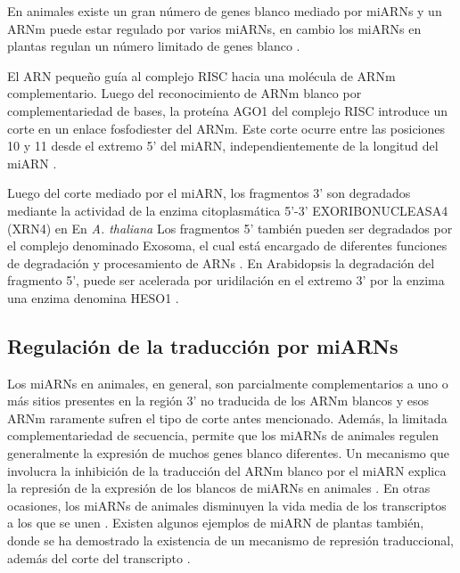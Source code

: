 En animales existe un gran número de genes blanco mediado por miARNs y un ARNm puede estar regulado por varios miARNs, en cambio los miARNs en plantas regulan un número limitado de genes blanco \citep{Voinnet2009669}.

El ARN pequeño guía al complejo RISC hacia una molécula de ARNm complementario. 
Luego del reconocimiento de ARNm blanco por complementariedad de bases, la proteína AGO1 del complejo RISC introduce un corte en un enlace fosfodiester del ARNm.
Este corte ocurre entre las posiciones 10 y 11 desde el extremo 5' del miARN, independientemente de la longitud del miARN \citep{Mallory2004,Llave2002,pmid12931144,Xie2003,pmid15057819}.

Luego del corte mediado por el miARN, los fragmentos 3' son degradados  mediante la actividad de la enzima citoplasmática 5'-3' EXORIBONUCLEASA4 (XRN4) en En \textit{A. thaliana}  \citep{pmid15260969}
Los fragmentos 5' también pueden ser degradados por el complejo denominado Exosoma, el cual está encargado de diferentes funciones de degradación y procesamiento de ARNs \citep{pmid18160042}.
En Arabidopsis la degradación del fragmento 5', puede ser acelerada por uridilación en el extremo 3' por la enzima una enzima denomina HESO1 \citep{pmid24733911}.

\subsection{Regulación de la traducción por miARNs}

Los miARNs en animales, en general, son parcialmente complementarios a uno o más sitios presentes en la región 3' no traducida de los ARNm blancos \citep{pmid12869753,pmid8252621,Fabian} y esos ARNm raramente sufren el tipo de corte antes mencionado. 
Además, la limitada complementariedad de secuencia, permite que los miARNs de animales regulen generalmente la expresión de muchos genes blanco diferentes.
Un mecanismo que involucra la inhibición de la traducción del ARNm blanco por el miARN explica la represión de la expresión de los blancos de miARNs en animales \citep{Fabian}.
En otras ocasiones, los miARNs de animales disminuyen la vida media de los transcriptos a los que se unen \citep{pmid20703300}.
Existen algunos ejemplos de miARN de plantas también, donde se ha demostrado la existencia de un mecanismo de represión traduccional, además del corte del transcripto \citep{Schwab2005517,pmid19531599,pmid18392778,pmid18483398,pmid12893888,pmid14555699}.

